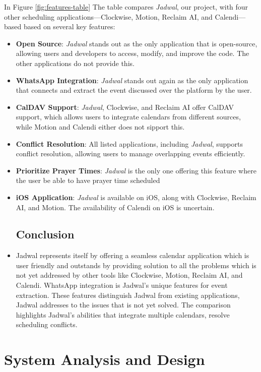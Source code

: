 \documentclass[12pt,a4paper]{report}
\begin{document}
In Figure \ref{fig:features-table} The table compares \textit{Jadwal}, our project, with four other scheduling applications—Clockwise, Motion, Reclaim AI, and Calendi—based based on several key features:
\begin{itemize}
    \item \textbf{Open Source}: \textit{Jadwal} stands out as the only application that is open-source, allowing users and developers to access, modify, and improve the code. The other applications do not provide this.
    \item \textbf{WhatsApp Integration}: \textit{Jadwal} stands out again as the only application that connects and extract the event discussed over the platform by the user.
    \item \textbf{CalDAV Support}: \textit{Jadwal}, Clockwise, and Reclaim AI offer CalDAV support, which allows users to integrate calendars from different sources, while Motion and Calendi either does not sipport this.
    \item \textbf{Conflict Resolution}: All listed applications, including \textit{Jadwal}, supports conflict resolution, allowing users to manage overlapping events efficiently.
    \item \textbf{Prioritize Prayer Times}: \textit{Jadwal} is the only one offering this feature where the user be able to have prayer time scheduled
    \item \textbf{iOS Application}: \textit{Jadwal} is available on iOS, along with Clockwise, Reclaim AI, and Motion. The availability of Calendi on iOS is uncertain.
    \section{Conclusion}
    \item Jadwal represents itself by offering a seamless calendar application which is user friendly and outstands by providing solution to all the problems which is not yet addressed by other tools like Clockwise, Motion, Reclaim AI, and Calendi. WhatsApp integration is Jadwal’s unique features for event extraction. These features distinguish Jadwal from existing applications, Jadwal addresses to the issues that is not yet solved.
    The comparison highlights Jadwal's abilities that integrate multiple calendars, resolve scheduling conflicts. 

\end{itemize}

\chapter{System Analysis and Design}
\end{document}
